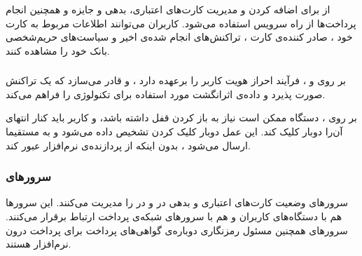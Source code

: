 \documentclass[oneside]{report}
\begin{document}
        \subsubsection{{\small {}}}
        از
           {\normalsize {}}
           برای اضافه کردن و مدیریت کارت‌های اعتباری، بدهی و جایزه و همچنین انجام پرداخت‌ها از راه سرویس 
              {\normalsize {}}
              استفاده می‌شود.
              کاربران می‌توانند اطلاعات مربوط به کارت خود ، صادر کننده‌ی کارت ، تراکنش‌های انجام شده‌ی اخیر و سیاست‌های حریم‌شخصی 
              بانک خود را مشاهده کنند.
 
         \subsubsection{{\small {}}}
                       {\normalsize {}}
    بر روی
               {\normalsize {}} و
                          {\normalsize {}}
                          ، 
                                     {\normalsize {}}
    فرآیند احراز هویت کاربر را برعهده دارد ، و قادر می‌سازد که یک تراکنش صورت پذیرد و داده‌ی اثرانگشت مورد استفاده برای تکنولوژی 
               {\normalsize {}}
               را فراهم می‌کند. 
               
   بر روی 
              {\normalsize {}}
              ، دستگاه ممکن است نیاز به باز کردن قفل داشته باشد، و کاربر باید کنار انتهای آن‌را دوبار کلیک کند. این عمل دوبار کلیک کردن تشخیص داده می‌شود و به 
                         {\normalsize {}}
                      مستقیما   ارسال می‌شود ، بدون اینکه از پردازنده‌ی نرم‌افزار عبور کند.
                      
      \subsubsection{سرورهای{\small {}}} 
      سرورهای 
   {\normalsize {}}
   وضعیت کارت‌های اعتباری و بدهی در 
   {\normalsize {}}
   و 
   {\normalsize {}}
   در 
   {\normalsize {}}
   را مدیریت می‌کنند. این سرورها هم با دستگاه‌‌های کاربران و هم با سرورهای شبکه‌ی پرداخت ارتباط برقرار می‌کنند.
   سرور‌های 
   {\normalsize {}}
   همچنین مسئول رمزنگاری دوباره‌ی گواهی‌های پرداخت 
         					برای پرداخت درون نرم‌افزار           
   هستند. 
               
\end{document}
